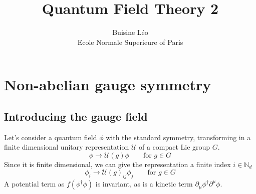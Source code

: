 \documentclass[a4paper]{book}
\theoremstyle{definition}
\theoremstyle{remark}
\begin{document}
\title{Quantum Field Theory 2}
\author{Buisine Léo\\Ecole Normale Superieure of Paris}
\maketitle

\tableofcontents

\chapter{Non-abelian gauge symmetry}

\section{Introducing the gauge field}

Let's consider a quantum field $\phi$ with the standard symmetry, transforming in a finite dimensional unitary representation $\mathcal U$ of a compact Lie group $G$. 
\begin{equation}
    \phi \rightarrow \mathcal U (g)\phi \qquad \text{for } g\in G
\end{equation}
Since it is finite dimensional, we can give the representation a finite index $i \in \mathbb{N}_d$
\begin{equation}
    \phi_i \rightarrow \mathcal U (g)_{ij}\phi_j \qquad \text{for } g\in G
\end{equation}
A potential term as $f(\phi^\dagger \phi)$ is invariant, as is a kinetic term $\partial_\mu \phi^\dagger \partial^\mu \phi$. \par \medskip 
\end{document}
